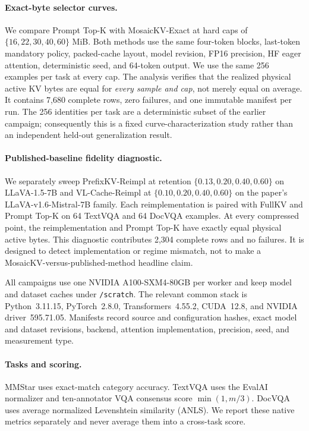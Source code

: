 \paragraph{Exact-byte selector curves.}
We compare Prompt Top-K with MosaicKV-Exact at hard caps of
\(\{16,22,30,40,60\}\) MiB.  Both methods use the same four-token blocks,
last-token mandatory policy, packed-cache layout, model revision, FP16
precision, HF eager attention, deterministic seed, and 64-token output.  We
use the same 256 examples per task at every cap.  The analysis verifies that
the realized physical active KV bytes are equal for \emph{every sample and
cap}, not merely equal on average.  It contains 7,680 complete rows, zero
failures, and one immutable manifest per run.  The 256 identities per task
are a deterministic subset of the earlier campaign; consequently this is a
fixed curve-characterization study rather than an independent held-out
generalization result.

\paragraph{Published-baseline fidelity diagnostic.}
We separately sweep PrefixKV-Reimpl at retention
\(\{0.13,0.20,0.40,0.60\}\) on LLaVA-1.5-7B and VL-Cache-Reimpl at
\(\{0.10,0.20,0.40,0.60\}\) on the paper's
LLaVA-v1.6-Mistral-7B family.  Each reimplementation is paired with FullKV
and Prompt Top-K on 64 TextVQA and 64 DocVQA examples.  At every compressed
point, the reimplementation and Prompt Top-K have exactly equal physical
active bytes.  This diagnostic contributes 2,304 complete rows and no
failures.  It is designed to detect implementation or regime mismatch, not
to make a MosaicKV-versus-published-method headline claim.

All campaigns use one NVIDIA A100-SXM4-80GB per worker and keep model and
dataset caches under \texttt{/scratch}.  The relevant common stack is
Python~3.11.15, PyTorch~2.8.0, Transformers~4.55.2, CUDA~12.8, and NVIDIA
driver~595.71.05.  Manifests record source and configuration hashes, exact
model and dataset revisions, backend, attention implementation, precision,
seed, and measurement type.

\paragraph{Tasks and scoring.}
MMStar uses exact-match category accuracy.  TextVQA uses the EvalAI
normalizer and ten-annotator VQA consensus score \(\min(1,m/3)\).  DocVQA
uses average normalized Levenshtein similarity (ANLS).  We report these
native metrics separately and never average them into a cross-task score.

